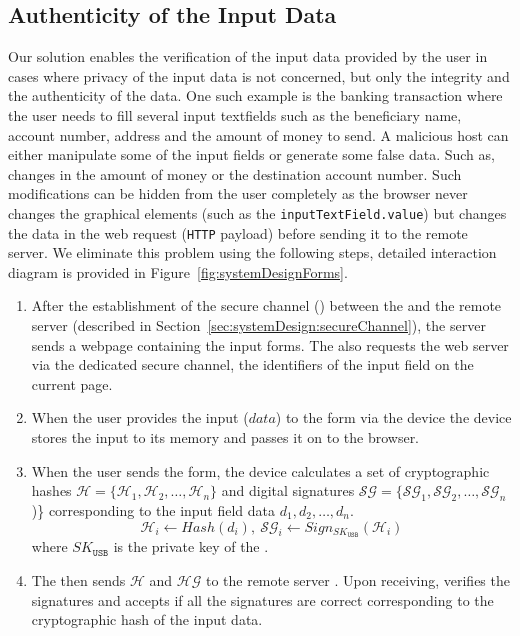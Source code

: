  
\subsection{Authenticity of the Input Data}
\label{sec:systemDesign:integrityVerification}

Our solution enables the verification of the input data provided by the user in cases where privacy of the input data is not concerned, but only the integrity and the authenticity of the data. One such example is the banking transaction where the user needs to fill several input textfields such as the beneficiary name, account number, address and the amount of money to send. A malicious host can either manipulate some of the input fields or generate some false data. Such as, changes in the amount of money or the destination account number. Such modifications can be hidden from the user completely as the browser never changes the graphical elements (such as the \texttt{inputTextField.value}) but changes the data in the web request (\texttt{HTTP} payload) before sending it to the remote server. We eliminate this problem using the following steps, detailed interaction diagram is provided in Figure~\ref{fig:systemDesignForms}.

\begin{enumerate}
  \item After the establishment of the secure channel (\tls) between the \device and the remote server (described in Section~\ref{sec:systemDesign:secureChannel}), the server sends a webpage containing the input forms. The \device also requests the web server via the dedicated secure channel, the identifiers of the input field on the current page.
  \item When the user provides the input ($data$) to the form via the device the device stores the input to its memory and passes it on to the browser.
  \item When the user sends the form, the device calculates a set of cryptographic hashes $\mathcal{H} = \{\mathcal{H}_1, \mathcal{H}_2, \ldots, \mathcal{H}_n\}$ and digital signatures $\mathcal{SG} = \{\mathcal{SG}_1, \mathcal{SG}_2, \ldots, \mathcal{SG}_n$)\} corresponding to the input field data $d_1, d_2, \ldots, d_n$. 
  $$\mathcal{H}_i \leftarrow Hash(d_i),\ \mathcal{SG}_i\leftarrow Sign_{{SK}_\texttt{USB}}(\mathcal{H}_i)$$
  where ${SK}_\texttt{USB}$ is the private key of the \device. 
  \item The \device then sends $\mathcal{H}$ and $\mathcal{HG}$ to the remote server \server. Upon receiving, \server verifies the signatures and accepts if all the signatures are correct corresponding to the cryptographic hash of the input data. 
\end{enumerate}

